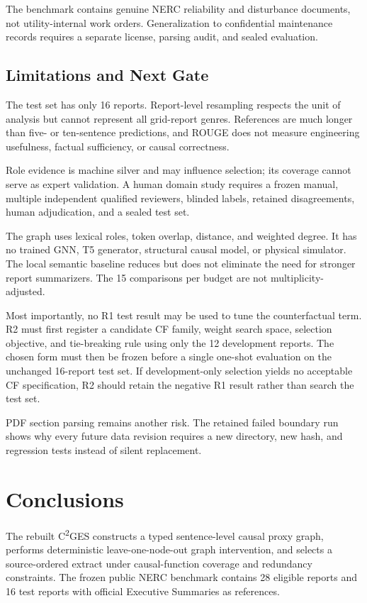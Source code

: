 \documentclass[applsci,article,submit,moreauthors]{Definitions/mdpi}
\newcommand{\cges}{C\textsuperscript{2}GES}
\begin{document}
The benchmark contains genuine NERC reliability and disturbance documents, not utility-internal work orders. Generalization to confidential maintenance records requires a separate license, parsing audit, and sealed evaluation.

\subsection{Limitations and Next Gate}

The test set has only 16 reports. Report-level resampling respects the unit of analysis but cannot represent all grid-report genres. References are much longer than five- or ten-sentence predictions, and ROUGE does not measure engineering usefulness, factual sufficiency, or causal correctness.

Role evidence is machine silver and may influence selection; its coverage cannot serve as expert validation. A human domain study requires a frozen manual, multiple independent qualified reviewers, blinded labels, retained disagreements, human adjudication, and a sealed test set.

The graph uses lexical roles, token overlap, distance, and weighted degree. It has no trained GNN, T5 generator, structural causal model, or physical simulator. The local semantic baseline reduces but does not eliminate the need for stronger report summarizers. The 15 comparisons per budget are not multiplicity-adjusted.

Most importantly, no R1 test result may be used to tune the counterfactual term. R2 must first register a candidate CF family, weight search space, selection objective, and tie-breaking rule using only the 12 development reports. The chosen form must then be frozen before a single one-shot evaluation on the unchanged 16-report test set. If development-only selection yields no acceptable CF specification, R2 should retain the negative R1 result rather than search the test set.

PDF section parsing remains another risk. The retained failed boundary run shows why every future data revision requires a new directory, new hash, and regression tests instead of silent replacement.

\section{Conclusions}

The rebuilt \cges{} constructs a typed sentence-level causal proxy graph, performs deterministic leave-one-node-out graph intervention, and selects a source-ordered extract under causal-function coverage and redundancy constraints. The frozen public NERC benchmark contains 28 eligible reports and 16 test reports with official Executive Summaries as references.
\end{document}

